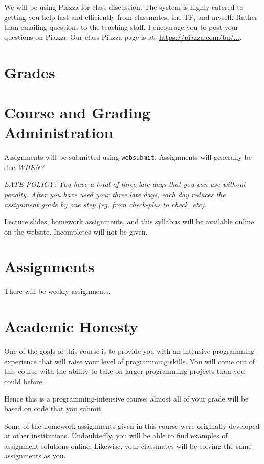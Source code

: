 \documentclass[11pt]{article}
\begin{document}
We will be using Piazza for class discussion. The system is highly
catered to getting you help fast and efficiently from classmates, the
TF, and myself. Rather than emailing questions to the teaching staff,
I encourage you to post your questions on Piazza.   Our class Piazza
page  is at: \url{https://piazza.com/bu/...}. 

\section*{Grades}

\section*{Course and Grading Administration}


Assignments will be submitted using \texttt{websubmit}.   Assignments will
generally be due \emph{WHEN?}

\emph{LATE POLICY: You have a total of three late days that you can use without penalty.
After you have used your three late days, each day reduces the
assignment grade by one step (eg, from check-plus to check, etc).}

\sloppypar
Lecture slides, homework assignments, and this syllabus will be available
online on the website.  Incompletes will not be given. 

\section*{Assignments}

There will be weekly assignments.

\section*{Academic Honesty}
One of the goals of this course is to provide you with an intensive
programming experience that will raise your level of programming
skills.  You will come out of this course with the ability to take on
larger programming projects than you could before.  

Hence this is a programming-intensive course;  almost all of your grade will
be based on code that you submit.   

Some of the homework assignments given in this course were originally developed
at other institutions.  Undoubtedly, you will be able to find examples of
assignment solutions online.   Likewise, your classmates will be solving
the same assignments as you.
\end{document}
